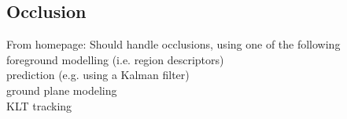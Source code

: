 \subsection{Occlusion}


From homepage:
Should handle occlusions, using one of the following\\
foreground modelling (i.e. region descriptors)\\
prediction (e.g. using a Kalman filter)\\
ground plane modeling\\
KLT tracking
